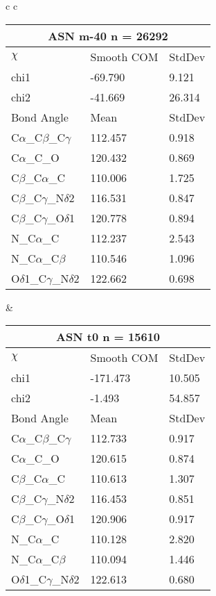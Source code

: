 \begin{longtable}{ c c }
  \\
  \begin{tabular}{ l l l }
  \toprule
  \multicolumn{3}{c}{ASN \textbf{m-40} n = 26292} \\ \toprule
  $\chi$       & Smooth COM & StdDev \\ \midrule
  chi1 & -69.790 & 9.121 \\ 
  chi2 & -41.669 & 26.314 \\ \midrule
  Bond Angle   & Mean     & StdDev \\ \midrule
  C$\alpha$\_C$\beta$\_C$\gamma$ & 112.457 & 0.918\\
  C$\alpha$\_C\_O & 120.432 & 0.869\\
  C$\beta$\_C$\alpha$\_C & 110.006 & 1.725\\
  C$\beta$\_C$\gamma$\_N$\delta$2 & 116.531 & 0.847\\
  C$\beta$\_C$\gamma$\_O$\delta$1 & 120.778 & 0.894\\
  N\_C$\alpha$\_C & 112.237 & 2.543\\
  N\_C$\alpha$\_C$\beta$ & 110.546 & 1.096\\
  O$\delta$1\_C$\gamma$\_N$\delta$2 & 122.662 & 0.698\\
  \bottomrule
  \end{tabular}
  &
  \begin{tabular}{ l l l }
  \toprule
  \multicolumn{3}{c}{ASN \textbf{t0} n = 15610} \\ \toprule
  $\chi$       & Smooth COM & StdDev \\ \midrule
  chi1 & -171.473 & 10.505 \\ 
  chi2 & -1.493 & 54.857 \\ \midrule
  Bond Angle   & Mean     & StdDev \\ \midrule
  C$\alpha$\_C$\beta$\_C$\gamma$ & 112.733 & 0.917\\
  C$\alpha$\_C\_O & 120.615 & 0.874\\
  C$\beta$\_C$\alpha$\_C & 110.613 & 1.307\\
  C$\beta$\_C$\gamma$\_N$\delta$2 & 116.453 & 0.851\\
  C$\beta$\_C$\gamma$\_O$\delta$1 & 120.906 & 0.917\\
  N\_C$\alpha$\_C & 110.128 & 2.820\\
  N\_C$\alpha$\_C$\beta$ & 110.094 & 1.446\\
  O$\delta$1\_C$\gamma$\_N$\delta$2 & 122.613 & 0.680\\
  \bottomrule
  \end{tabular}

\end{longtable}
